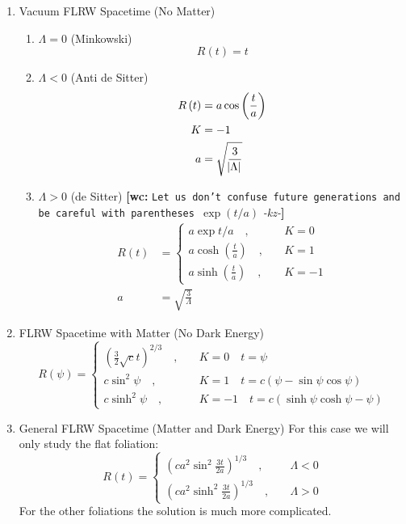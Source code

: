 \documentclass[preprint,notitlepage,amsmath,amssymb,floatfix]{revtex4-1}
\newcommand{\XXX}[3]{{\bf [#1: } {\tt #3} {\it -#2-}{\bf ]}}
\begin{document}
\begin{enumerate}
  \item Vacuum FLRW Spacetime (No Matter)
  \begin{enumerate}
    \item $\Lambda = 0$ (Minkowski)
    \begin{equation}
    R\left(t\right) = t
    \end{equation}
    \item $\Lambda < 0$ (Anti de Sitter)
    \begin{equation}
    \begin{split}
    R\left(t\right) &= a\cos\left(\frac{t}{a}\right) \\
    K &= -1 \\
    a &= \sqrt{\frac{3}{\abs{\Lambda}}}
    \end{split}
    \end{equation}
    \item $\Lambda > 0$ (de Sitter) \XXX{wc}{kz}{Let us don't confuse future generations and be careful with parentheses $\exp{(t/a)}$}
    \begin{equation}
    \begin{split}
    R\left(t\right) &= 
    \begin{cases}
      a\exp{t/a}\quad,  & \quad K = 0 \\
      a\cosh\left(\frac{t}{a}\right)\quad, & \quad K = 1 \\
      a\sinh\left(\frac{t}{a}\right)\quad, & \quad K = -1
    \end{cases} \\
    a &= \sqrt{\frac{3}{\Lambda}}
    \end{split}
    \end{equation}
  \end{enumerate}

  \item FLRW Spacetime with Matter (No Dark Energy)
  \begin{equation}
  R\left(\psi\right) = 
  \begin{cases}
    \left(\frac{3}{2}\sqrt{c}t\right)^{2/3}\quad, & \quad K = 0 \quad t = \psi \\
    c\sin^2\psi\quad, & \quad K = 1 \quad t = c\left(\psi - \sin\psi\cos\psi\right) \\
    c\sinh^2\psi\quad, & \quad K = -1 \quad t = c\left(\sinh\psi\cosh\psi - \psi\right)
  \end{cases}
  \end{equation}

  \item General FLRW Spacetime (Matter and Dark Energy)
  For this case we will only study the flat foliation:
  \begin{equation}
  R\left(t\right) = 
  \begin{cases}
    \left(c a^2\sin^2\frac{3t}{2a}\right)^{1/3}\quad, & \quad \Lambda < 0 \\
    \left(c a^2\sinh^2\frac{3t}{2a}\right)^{1/3}\quad, & \quad \Lambda > 0
  \end{cases}
  \end{equation}
  For the other foliations the solution is much more complicated.
\end{enumerate}
\end{document}
